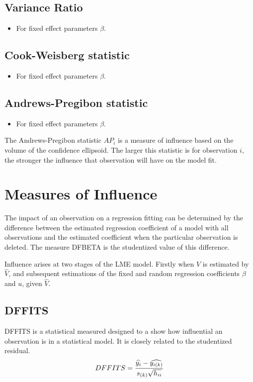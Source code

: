 \documentclass[Main.tex]{subfiles}
\begin{document}
	\subsection{Variance Ratio} %
	\begin{itemize}
		\item For fixed effect parameters $\beta$.
	\end{itemize}
	
	\subsection{Cook-Weisberg statistic} %
	\begin{itemize}
		\item For fixed effect parameters $\beta$.
	\end{itemize}
	
	\subsection{Andrews-Pregibon statistic} %
	\begin{itemize}
		\item For fixed effect parameters $\beta$.
	\end{itemize}
	The Andrews-Pregibon statistic $AP_{i}$ is a measure of influence based on the volume of the confidence ellipsoid.
	The larger this statistic is for observation $i$, the stronger the influence that observation will have on the model fit.
	
\newpage	
\section{Measures of Influence} %

The impact of an observation on a regression fitting can be determined by the difference between the estimated regression coefficient of a model with all observations and the estimated coefficient when the particular observation is deleted. The measure DFBETA is the studentized value of this difference.

Influence arises at two stages of the LME model. Firstly when $V$ is estimated by $\hat{V}$, and subsequent
estimations of the fixed and random regression coefficients $\beta$ and $u$, given $\hat{V}$.


\subsection{DFFITS} %
DFFITS is a statistical measured designed to a show how influential an observation is in a statistical model. It is closely related to the studentized residual.
\begin{displaymath} DFFITS = {\widehat{y_i} -
\widehat{y_{i(k)}} \over s_{(k)} \sqrt{h_{ii}}} \end{displaymath}
\end{document}
